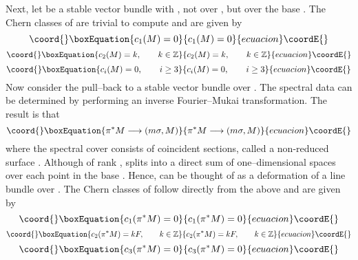 \documentclass[a4paper,12pt]{article}
\numberwithin{equation}{section}
\theoremstyle{plain}
\begin{document}
Next, let \coordHE{} be a stable \coordHE{} vector bundle with \coordHE{}, 
not over \coordHE{}, but over the base \coordHE{}. The Chern classes of \coordHE{} are trivial to
compute and are given by
\begin{equation}\coord{}\boxEquation{
c_{1}(M)=0
\label{eq:128}
}{
c_{1}(M)=0
}{ecuacion}\coordE{}\end{equation}
\begin{equation}\coord{}\boxEquation{
c_{2}(M)=k, \qquad k\in {\mathbb Z}
\label{eq:129}
}{
c_{2}(M)=k, \qquad k\in {\mathbb Z}
}{ecuacion}\coordE{}\end{equation}
\begin{equation}\coord{}\boxEquation{
c_{i}(M)=0, \qquad i\geq3
\label{eq:130}
}{
c_{i}(M)=0, \qquad i\geq3
}{ecuacion}\coordE{}\end{equation}
Now consider the pull--back to a stable \coordHE{} vector bundle 
\coordHE{} over \coordHE{}. The spectral data can be determined by performing an
inverse Fourier--Mukai transformation. The result is that
\begin{equation}\coord{}\boxEquation{
\pi^{*}M \longrightarrow (m\sigma, M)
\label{eq:131}
}{
\pi^{*}M \longrightarrow (m\sigma, M)
}{ecuacion}\coordE{}\end{equation}
where the spectral cover \coordHE{} consists of \coordHE{} coincident sections, called
a non-reduced surface \cite{BJPS}. Although of rank \coordHE{}, 
\coordHE{} splits into a direct
sum of \coordHE{} one--dimensional spaces over each point in the base \coordHE{}. Hence, \coordHE{}
can be thought of as a deformation of 
a line bundle over \coordHE{}. The Chern classes of
\coordHE{} follow directly from the above and are given by
\begin{equation}\coord{}\boxEquation{
c_{1}(\pi^{*}M)=0
\label{eq:132}
}{
c_{1}(\pi^{*}M)=0
}{ecuacion}\coordE{}\end{equation}
\begin{equation}\coord{}\boxEquation{
c_{2}(\pi^{*}M)=kF, \qquad k \in {\mathbb Z}
\label{eq:133}
}{
c_{2}(\pi^{*}M)=kF, \qquad k \in {\mathbb Z}
}{ecuacion}\coordE{}\end{equation}
\begin{equation}\coord{}\boxEquation{
c_{3}(\pi^{*}M)=0
\label{eq:134}
}{
c_{3}(\pi^{*}M)=0
}{ecuacion}\coordE{}\end{equation}
\end{document}
